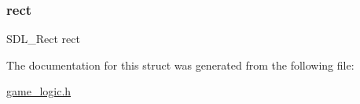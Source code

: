 \mbox{\label{structmove__point_a55aefd071649ac9dd8133e2d8a52d11f}} 
\subsubsection{\texorpdfstring{rect}{rect}}
{\footnotesize\ttfamily S\+D\+L\+\_\+\+Rect rect}



The documentation for this struct was generated from the following file\+:\begin{DoxyCompactItemize}
\item 
\mbox{\hyperlink{game__logic_8h}{game\+\_\+logic.\+h}}\end{DoxyCompactItemize}
